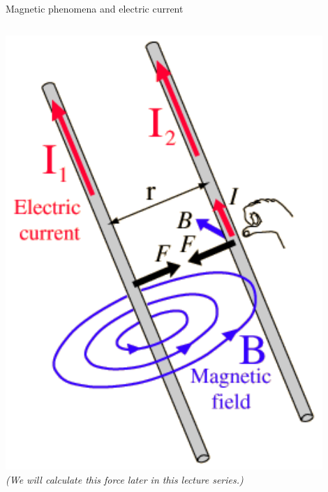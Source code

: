 \begin{frame}{Magnetic phenomena and electric current}
\begin{columns}
\begin{column}{0.30\textwidth}
\begin{center}
      \includegraphics[width=0.90\textwidth]{./images/schematics/magnetic_force_between_wires.png}\\
      \vspace{0.2cm}
      {\small \it (We will calculate this force later in this lecture series.)}\\
    \end{center}
  \end{column}
\end{columns}

\end{frame}

%
%
%

